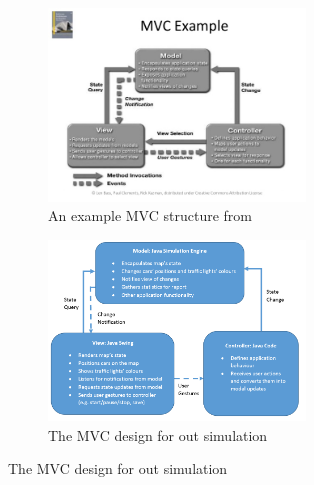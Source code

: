\documentclass{article}
\begin{document}
   \begin{figure}[p]
   	\centering
   	   	\begin{subfigure}{\textwidth}
   	   		\centering
   	   		\includegraphics[width=0.75\textwidth]{MVCExample.jpg}
   	   		\caption{An example MVC structure from \cite{bass2007software}}
   	   	\end{subfigure}	
   	   	\par \bigskip
   	\begin{subfigure}{\textwidth}
   		\centering
   		\includegraphics[width=0.75\textwidth]{mvc}
   		\caption{The MVC design for out simulation}
   		\label{OurMvc}
   	\end{subfigure}
   	

   	   \end{figure}
   	
\end{document}
